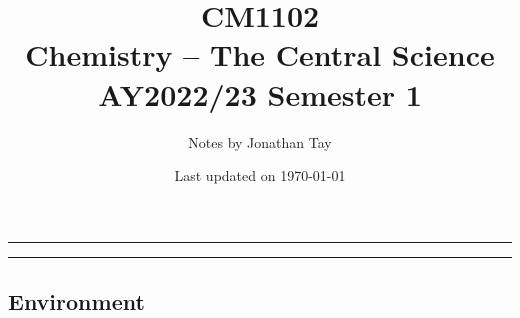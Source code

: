 \documentclass{article}
\title{\vspace{-1cm}\textbf{CM1102 \\[0.25em] Chemistry -- The Central Science} \\[2em] \Large AY2022/23 Semester 1 \\[1em]}
\author{Notes by Jonathan Tay}
\date{Last updated on \today}
\newcommand{\pageline}[1]{\par\noindent\rule{\textwidth}{#1}} %
\begin{document}
    
    \maketitle
    \pageline{1.5pt}
    \renewcommand{\baselinestretch}{0.75}\normalsize
    \tableofcontents
    \renewcommand{\baselinestretch}{1.1}\normalsize
    \pageline{1.5pt}

    \newpage
    \begin{multicols*}{2}
        \part{Environment}
        
        
        
        
    \end{multicols*}
    
\end{document}
